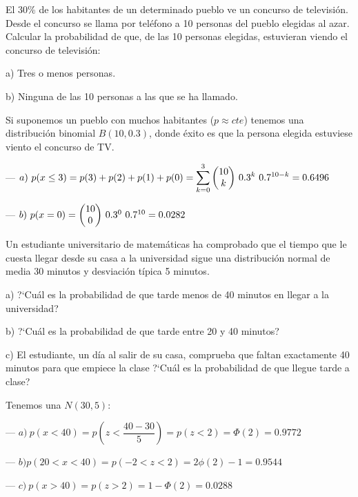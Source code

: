 \vspace{4mm}
\begin{ejemplo}
\begin{ejer}
	El 30\% de los habitantes de un determinado pueblo ve un concurso de televisión. Desde el concurso se llama por teléfono a 10 personas del pueblo elegidas al azar. Calcular la probabilidad de que, de las 10 personas elegidas, estuvieran viendo el concurso de televisión:

a) Tres o menos personas.

b) Ninguna de las 10 personas a las que se ha llamado.


\end{ejer}
\end{ejemplo}
Si suponemos un pueblo con muchos habitantes ($p\approx cte$) tenemos una distribución binomial $B(10,0.3)$, donde éxito es que la persona elegida estuviese viento el concurso de TV.

--- $a) \ p(x\le 3)=p(3)+p(2)+p(1)+p(0)=\displaystyle \sum_{k=0}^3 \mqty(10\\k)\ 0.3^k \ 0.7^{10-k}=0.6496$

--- $b)\ p(x=0)=\mqty(10\\0) \ 0.3^0 \ 0.7^{10}=0.0282$


\vspace{4mm}
\begin{ejemplo}
\begin{ejer}
Un estudiante universitario de matemáticas ha comprobado que el tiempo que le cuesta llegar desde su casa a la universidad sigue una distribución normal de media 30 minutos y desviación típica 5 minutos.

a) ?`Cuál es la probabilidad de que tarde menos de 40 minutos en llegar a la universidad? 

b)  ?`Cuál es la probabilidad de que tarde entre 20 y 40 minutos?

c) El estudiante, un día al salir de su casa, comprueba que faltan exactamente 40 minutos para que empiece la clase ?`Cuál es la probabilidad de que llegue tarde a clase?


\end{ejer}
\end{ejemplo}
Tenemos una $N(30,5)$:

--- $a)\ p(x<40)=p \left( z<\dfrac{40-30}{5} \right) =p(z<2)=\Phi(2)=0.9772$

--- $b) p(20<x<40)=p(-2<z<2)=2\phi(2)-1=0.9544$

--- $c)\ p(x>40)=p(z>2)=1-\Phi(2)=0.0288$

